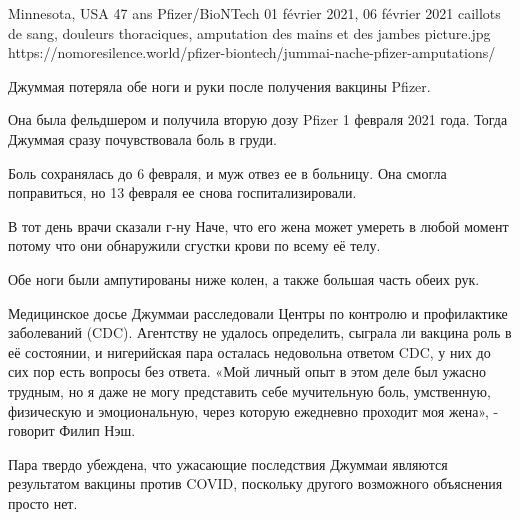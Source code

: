           {Minnesota, USA}
          {47 ans}
          {Pfizer/BioNTech}
          {01 février 2021, 06 février 2021}
          {caillots de sang, douleurs thoraciques, amputation des mains et des jambes}
          {picture.jpg}
          {https://nomoresilence.world/pfizer-biontech/jummai-nache-pfizer-amputations/}
          {           

Джуммая потеряла обе ноги и руки после получения вакцины Pfizer.

Она была фельдшером и получила вторую дозу Pfizer 1 февраля 2021 года. Тогда Джуммая сразу почувствовала боль в груди.

Боль сохранялась до 6 февраля, и муж отвез ее в больницу. Она смогла поправиться, но 13 февраля ее снова госпитализировали.

В тот день врачи сказали г-ну Наче, что его жена может умереть в любой момент потому что они обнаружили сгустки крови по всему её телу.

Обе ноги были ампутированы ниже колен, а также большая часть обеих рук.

Медицинское досье Джуммаи расследовали Центры по контролю и профилактике заболеваний (CDC). Агентству не удалось определить, сыграла ли вакцина роль в её состоянии, и нигерийская пара осталась недовольна ответом CDC, у них до сих пор есть вопросы без ответа. «Мой личный опыт в этом деле был ужасно трудным, но я даже не могу представить себе мучительную боль, умственную, физическую и эмоциональную, через которую ежедневно проходит моя жена», - говорит Филип Нэш.

Пара твердо убеждена, что ужасающие последствия Джуммаи являются результатом вакцины против COVID, поскольку другого возможного объяснения просто нет.

}
